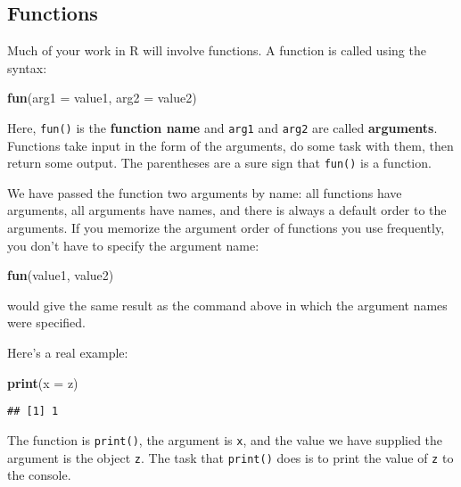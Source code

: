 \documentclass[]{book}
\newenvironment{Shaded}{\begin{snugshade}}{\end{snugshade}}
\newcommand{\KeywordTok}[1]{\textcolor[rgb]{0.13,0.29,0.53}{\textbf{#1}}}
\newcommand{\DataTypeTok}[1]{\textcolor[rgb]{0.13,0.29,0.53}{#1}}
\newcommand{\NormalTok}[1]{#1}
\theoremstyle{definition}
\theoremstyle{definition}
\theoremstyle{definition}
\theoremstyle{remark}
\begin{document}
\subsection{Functions}\label{functions}

Much of your work in R will involve functions. A function is called
using the syntax:

\begin{Shaded}
\begin{Highlighting}[]
\KeywordTok{fun}\NormalTok{(}\DataTypeTok{arg1 =}\NormalTok{ value1, }\DataTypeTok{arg2 =}\NormalTok{ value2)}
\end{Highlighting}
\end{Shaded}

Here, \texttt{fun()} is the \textbf{function name} and \texttt{arg1} and
\texttt{arg2} are called \textbf{arguments}. Functions take input in the
form of the arguments, do some task with them, then return some output.
The parentheses are a sure sign that \texttt{fun()} is a function.

We have passed the function two arguments by name: all functions have
arguments, all arguments have names, and there is always a default order
to the arguments. If you memorize the argument order of functions you
use frequently, you don't have to specify the argument name:

\begin{Shaded}
\begin{Highlighting}[]
\KeywordTok{fun}\NormalTok{(value1, value2)}
\end{Highlighting}
\end{Shaded}

would give the same result as the command above in which the argument
names were specified.

Here's a real example:

\begin{Shaded}
\begin{Highlighting}[]
\KeywordTok{print}\NormalTok{(}\DataTypeTok{x =}\NormalTok{ z)}
\end{Highlighting}
\end{Shaded}

\begin{verbatim}
## [1] 1
\end{verbatim}

The function is \texttt{print()}, the argument is \texttt{x}, and the
value we have supplied the argument is the object \texttt{z}. The task
that \texttt{print()} does is to print the value of \texttt{z} to the
console.
\end{document}
